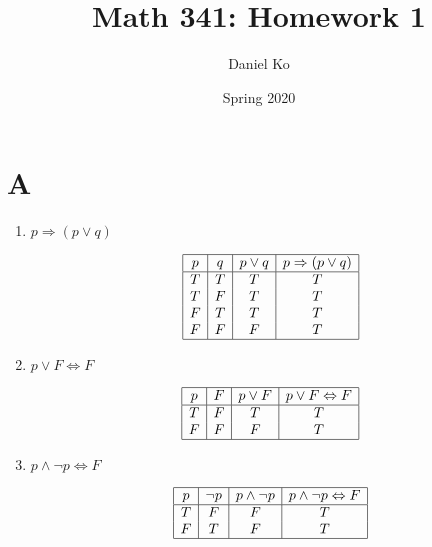 \documentclass[11pt]{scrartcl}
\title{Math 341: Homework 1}
\author{Daniel Ko}
\date{Spring 2020}
\begin{document}
\maketitle

\section{A}
\begin{enumerate}[label=\alph*.]
	\item{
		$p \Rightarrow (p \lor q)$
		\begin{center}
		\begin{displaymath}
		\begin{array}{|c|c|c|c|}
			\hline
			p & q & p \lor q & p \Rightarrow (p \lor q) \\ 
			\hline
			T & T & T & T\\
			T & F & T & T\\
			F & T & T & T\\
			F & F & F & T\\
			\hline
		\end{array}
		\end{displaymath}
		\end{center}
		}
	\item{
		$p \lor F \Leftrightarrow F$
		\begin{center}
		\begin{displaymath}
		\begin{array}{|c|c|c|c|}
			\hline
			p & F & p \lor F & p \lor F \Leftrightarrow F \\ 
			\hline
			T & F & T & T\\
			F & F & F & T\\
			\hline
		\end{array}
		\end{displaymath}
		\end{center}
		}
	\item{
		$p \land \lnot p \Leftrightarrow F$
		\begin{center}
		\begin{displaymath}
		\begin{array}{|c|c|c|c|}
			\hline
			p & \lnot p & p \land \lnot p & p \land \lnot p \Leftrightarrow F\\ 
			\hline
			T & F & F & T\\
			F & T & F & T\\
			\hline
		\end{array}
		\end{displaymath}
		\end{center}
		}
\end{enumerate}
\end{document}
